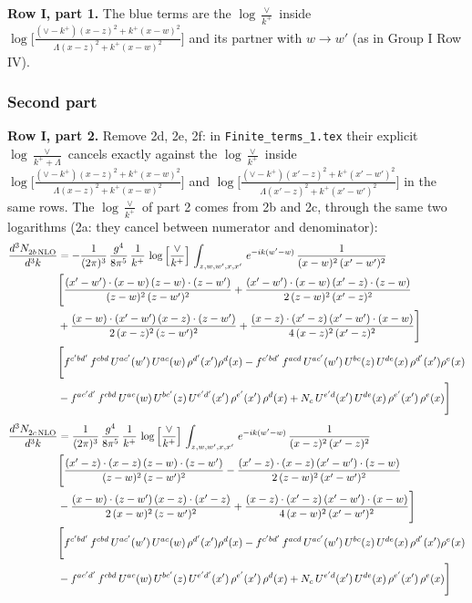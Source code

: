 \documentclass[9pt]{article}
\newcommand{\new}[1]{{\color{blue}#1}}
\numberwithin{equation}{section}
\begin{document}
\new{\textbf{Row I, part 1.} The blue terms are the $\log\frac{\vee}{k^+}$ inside $\log\Big[\frac{(\vee-k^{+})(x-z)^{2}+k^{+}(x-w)^{2}}{\Lambda(x-z)^{2}+k^{+}(x-w)^{2}}\Big]$ and its partner with $w\to w'$ (as in Group I Row IV).}
\subsubsection{Second part}
\new{\textbf{Row I, part 2.} Remove 2d, 2e, 2f: in \texttt{Finite\_terms\_1.tex} their explicit $\log\frac{\vee}{k^++\Lambda}$ cancels exactly against the $\log\frac{\vee}{k^+}$ inside $\log\Big[\frac{(\vee-k^{+})(x-z)^{2}+k^{+}(x-w)^{2}}{\Lambda(x-z)^{2}+k^{+}(x-w)^{2}}\Big]$ and $\log\Big[\frac{(\vee-k^{+})(x'-z)^{2}+k^{+}(x'-w')^{2}}{\Lambda(x'-z)^{2}+k^{+}(x'-w')^{2}}\Big]$ in the same rows. The $\log\frac{\vee}{k^+}$ of part 2 comes from 2b and 2c, through the same two logarithms (2a: they cancel between numerator and denominator):}
{\color{blue}
\begin{align}
\frac{d^{3}N_{2b\,\rm NLO}^{\rm}}{d^{3}k}  & = -\frac{1}{(2\pi)^{3}}\, \frac{g^{4}}{8\pi^{5}}\,\frac{1}{k^{+}}\,\log{\left[\frac{\vee}{k^{+}}\right]}\,\int_{z,w,w^{\prime},x,x'}\, e^{-ik(w^{\prime}-w)}\, \frac{1}{(x-w)^{2}\,(x'-w')^{2}} \notag \\
& \Bigg[\frac{(x'-w')\cdot (x-w)\, (z-w)\cdot (z-w')}{(z-w)^{2}\, (z-w')^{2}}+\frac{(x'-w')\cdot (x-w)\, (x'-z)\cdot (z-w)}{2\, (z-w)^{2}\, (x'-z)^{2}}\notag \\
& +\frac{(x-w)\cdot (x'-w')\, (x-z)\cdot (z-w')}{2\, (x-z)^{2}\, (z-w')^{2}}+\frac{(x-z)\cdot (x'-z)\, (x'-w')\cdot (x-w)}{4\, (x-z)^{2}\, (x'-z)^{2}}\Bigg]\notag \\
& \Bigg[f^{c'bd'}\,f^{cbd}\, U^{ac'}(w')\,U^{ac}(w)\,\rho^{d'}(x')\rho^{d}(x)- f^{c'bd'}\,f^{acd}\,U^{ac'}(w')\,U^{bc}(z)\,U^{de}(x)\,\rho^{d'}(x')\rho^{e}(x)\notag \\
& -f^{ac'd'}\,f^{cbd}\,U^{ac}(w)\,U^{bc'}(z)\,U^{e'd'}(x')\,\rho^{e'}(x')\,\rho^{d}(x) +N_{c}\,U^{e'd}(x')\,U^{de}(x)\,\rho^{e'}(x')\,\rho^{e}(x)\Bigg]
\end{align}
\begin{align}
\frac{d^{3}N_{2c\,\rm NLO}^{\rm}}{d^{3}k}  & = \frac{1}{(2\pi)^{3}}\, \frac{g^{4}}{8\pi^{5}}\,\frac{1}{k^{+}}\,\log{\left[\frac{\vee}{k^{+}}\right]}\,\int_{z,w,w^{\prime},x,x'}\, e^{-ik(w^{\prime}-w)}\, \frac{1}{(x-z)^{2}\,(x'-z)^{2}} \notag \\
& \Bigg[\frac{(x'-z)\cdot (x-z)\, (z-w)\cdot (z-w')}{(z-w)^{2}\, (z-w')^{2}}-\frac{(x'-z)\cdot (x-z)\, (x'-w')\cdot (z-w)}{2\, (z-w)^{2}\, (x'-w')^{2}}\notag \\
& -\frac{(x-w)\cdot (z-w')\, (x-z)\cdot (x'-z)}{2\, (x-w)^{2}\, (z-w')^{2}}+\frac{(x-z)\cdot (x'-z)\, (x'-w')\cdot (x-w)}{4\, (x-w)^{2}\, (x'-w')^{2}}\Bigg]\notag \\
& \Bigg[f^{c'bd'}\,f^{cbd}\, U^{ac'}(w')\,U^{ac}(w)\,\rho^{d'}(x')\rho^{d}(x)- f^{c'bd'}\,f^{acd}\,U^{ac'}(w')\,U^{bc}(z)\,U^{de}(x)\,\rho^{d'}(x')\rho^{e}(x)\notag \\
& -f^{ac'd'}\,f^{cbd}\,U^{ac}(w)\,U^{bc'}(z)\,U^{e'd'}(x')\,\rho^{e'}(x')\,\rho^{d}(x) +N_{c}\,U^{e'd}(x')\,U^{de}(x)\,\rho^{e'}(x')\,\rho^{e}(x)\Bigg]
\end{align}}
\end{document}
